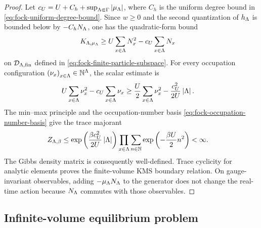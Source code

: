\documentclass[11pt,a4paper]{article}
\theoremstyle{plain}
\theoremstyle{definition}
\theoremstyle{remark}
\begin{document}
\begin{proof}
Let
$c_U = U + C_h + \sup_{\Lambda \Subset \Gamma}\abs{\smchemicalpotential_{\Lambda}}$, where
$C_h$ is the uniform degree bound in \eqref{eq:fock-uniform-degree-bound}.
Since $w \geq 0$ and the second quantization of $\physham[h]_{\Lambda}$ is bounded below by
$-C_h \opfocknumber_{\Lambda}$, one has the quadratic-form bound
$$\begin{aligned}
K_{\Lambda,\smchemicalpotential_{\Lambda}}
& \geq
U \sum_{x \in \Lambda}N_x^2 - c_U \sum_{x \in \Lambda}N_x
\end{aligned}$$
on $\sphilb{D}_{\Lambda,\txtfin}$ defined in
\eqref{eq:fock-finite-particle-subspace}.
For every occupation configuration
$\seq{\nu_x}{x \in \Lambda} \in \monnat^{\Lambda}$, the scalar estimate is
$$\begin{aligned}
U \sum_{x \in \Lambda}\nu_x^2 - c_U \sum_{x \in \Lambda}\nu_x
& \geq
\frac{U}{2}\sum_{x \in \Lambda}\nu_x^2
-
\frac{c_U^2}{2U}\left| \Lambda \right|.
\end{aligned}$$
The min--max principle and the occupation-number basis
\eqref{eq:fock-occupation-number-basis} give the trace majorant
$$\begin{aligned}
Z_{\Lambda,\beta}
& \leq
\exp \left( \frac{\beta c_U^2}{2U}\left| \Lambda \right| \right)
\prod_{x \in \Lambda}
\sum_{n \in \mathbb{N}}\exp \left( -\frac{\beta U}{2}n^2 \right)
<
\infty.
\end{aligned}$$
The Gibbs density matrix is consequently well-defined.
Trace cyclicity for analytic elements proves the finite-volume KMS boundary relation.
On gauge-invariant observables, adding $-\smchemicalpotential_{\Lambda}\opfocknumber_{\Lambda}$ to the generator
does not change the real-time action because $\opfocknumber_{\Lambda}$ commutes with those observables.
\end{proof}

\subsection{Infinite-volume equilibrium problem}\label{infinite-volume-equilibrium-problem}
\end{document}
